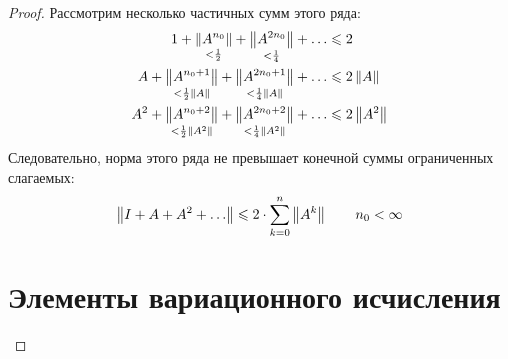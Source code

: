 \documentclass[12pt]{article}
\begin{document}
\begin{proof}
		Рассмотрим несколько частичных сумм этого ряда:
		\begin{align*}
			1 + \underset{< \frac{1}{2}}{\left\| A^{n_0} \right\|} + \underset{< \frac{1}{4}}{\left\| A^{2n_0} \right\|} + \ldots &\leqslant 2 \\
			A + \underset{< \frac{1}{2}\left\| A \right\|}{\left\| A^{n_0+1} \right\|} 
			+ \underset{< \frac{1}{4}\left\| A \right\|}{\left\| A^{2n_0+1} \right\|} + \ldots &\leqslant 2 \left\| A \right\| \\
			A^2 + \underset{< \frac{1}{2}\left\| A^2 \right\|}{\left\| A^{n_0+2} \right\|} 
			+ \underset{< \frac{1}{4}\left\| A^2 \right\|}{\left\| A^{2n_0+2} \right\|} + \ldots &\leqslant 2 \left\| A^2 \right\| \\
		\end{align*}
		Следовательно, норма этого ряда не превышает конечной суммы ограниченных слагаемых:
		$$\left\| I + A + A^2 + \ldots \right\| \leqslant 2\cdot\sum_{k=0}^n\left\| A^k \right\| \qquad n_0 < \infty$$
		
		\section{Элементы вариационного исчисления}
	\end{proof}
\end{document}
